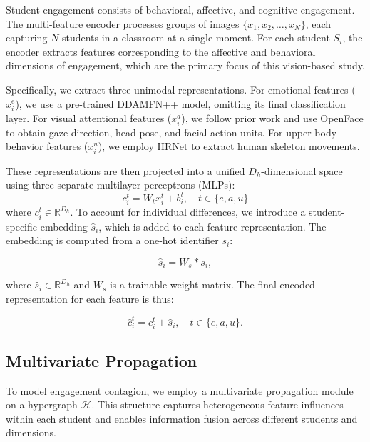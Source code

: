 \documentclass[runningheads]{llncs}
\begin{document}
Student engagement consists of behavioral, affective, and cognitive engagement. The multi-feature encoder processes groups of images $\{x_1, x_2, \ldots, x_N\}$, each capturing $N$ students in a classroom at a single moment. For each student $S_i$, the encoder extracts features corresponding to the affective and behavioral dimensions of engagement, which are the primary focus of this vision-based study.

Specifically, we extract three unimodal representations. For emotional features ($x_i^e$), we use a pre-trained DDAMFN++ \cite{zhang2023dual} model, omitting its final classification layer. For visual attentional features ($x_i^a$), we follow prior work \cite{reverdy2022roomreader,li2024multimodal} and use OpenFace \cite{baltruvsaitis2016openface} to obtain gaze direction, head pose, and facial action units. For upper-body behavior features ($x_i^u$), we employ HRNet \cite{lu2024hrnet} to extract human skeleton movements.


These representations are then projected into a unified $D_h$-dimensional space using three separate multilayer perceptrons (MLPs):
\begin{equation} \label{eq:e2}
	c_i^t = W_t x_i^t + b_i^t, \quad t \in \{e, a, u\}
\end{equation}
\noindent where $c_i^t \in \mathbb{R}^{D_h}$. To account for individual differences, we introduce a student-specific embedding $\hat{s}_i$, which is added to each feature representation. The embedding is computed from a one-hot identifier $s_i$:


\begin{equation}\label{eq:e1}
	\hat{s}_i = W_s \ast s_i,
\end{equation}

\noindent where $\hat{s}_i \in \mathbb{R}^{D_h}$ and $W_s$ is a trainable weight matrix. The final encoded representation for each feature is thus:

\begin{equation} \label{eq:e3}
	\hat{c}_i^t = c_i^t + \hat{s}_i,\quad t \in \{e,a,u\}.
\end{equation}



\subsection{Multivariate Propagation}{\label{Multivariate propagation}}
To model engagement contagion, we employ a multivariate propagation module on a hypergraph $\mathcal{H}$. This structure captures heterogeneous feature influences within each student and enables information fusion across different students and dimensions.
\end{document}
